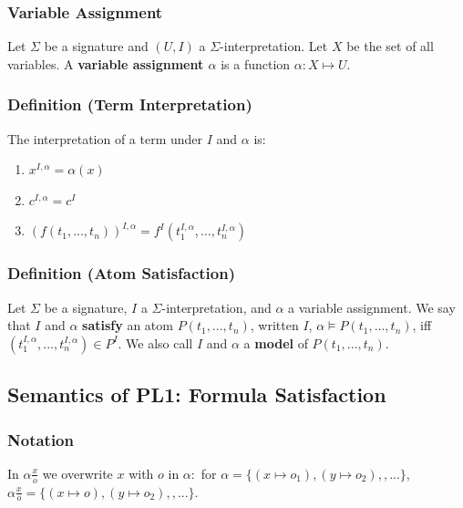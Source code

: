 \documentclass[conference]{styles/acmsiggraph}
\begin{document}
        \subsubsection{Variable Assignment}
            Let $\Sigma$ be a signature and $(U,I)$ a $\Sigma$-interpretation.\newline
            Let $X$ be the set of all variables.\newline
            A \textbf{variable assignment $\alpha$} is a function $\alpha : X \mapsto U$.
        
        \subsubsection{Definition (Term Interpretation)}
            The interpretation of a term under $I$ and $\alpha$ is:
            \begin{enumerate}
                \item $x^{I,\alpha} = \alpha(x)$
                \item $c^{I,\alpha} = c^I$
                \item $(f(t_1,...,t_n))^{I,\alpha} = f^I(t^{I,\alpha}_1,...,t^{I,\alpha}_n)$
            \end{enumerate}
        
        \subsubsection{Definition (Atom Satisfaction)}
            Let $\Sigma$ be a signature, $I$ a $\Sigma$-interpretation, and $\alpha$ a variable assignment.\newline
            We say that $I$ and $\alpha$ \textbf{satisfy} an atom $P(t_1,...,t_n)$, written $I$, $\alpha \vDash P(t_1,...,t_n)$, iff $(t^{I,\alpha}_1,...,t^{I,\alpha}_n) \in P^I$.\newline
            We also call $I$ and $\alpha$ a \textbf{model} of $P(t_1,...,t_n)$.
    
    
    \subsection{Semantics of PL1: Formula Satisfaction}
        \subsubsection{Notation}
            In $\alpha \frac{x}{o}$ we overwrite $x$ with $o$ in $\alpha:$ for $\alpha = \{(x \mapsto o_1),(y \mapsto o_2),,...\}$, $\alpha \frac{x}{o} = \{(x \mapsto o),(y \mapsto o_2),,...\}$.
        
\end{document}
